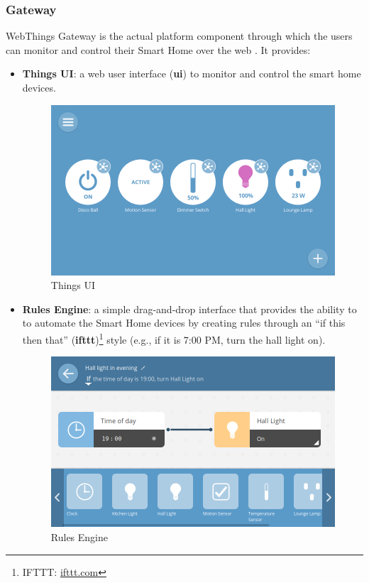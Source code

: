 \subsubsection{Gateway}
WebThings Gateway is the actual platform component through which the users can monitor and control their Smart Home over the web \cite{wtgateway}. It provides:
\begin{itemize}
    \item \textbf{Things UI}: a web user interface (\textbf{\gls{ui}}) to monitor and control the smart home devices.
        \begin{figure}[H]
        \centering
        \includegraphics[scale=0.25]{images/webthings/things_ui_screenshot.png}
        \caption{Things UI \cite{wtgateway}}
        \end{figure}

    \item \textbf{Rules Engine}: a simple drag-and-drop interface that provides the ability to to automate the Smart Home devices by creating rules through an ``if this then that'' (\textbf{\gls{ifttt}})\footnote{IFTTT: \href{https://ifttt.com/explore/new_to_ifttt}{ifttt.com}} style (e.g., if it is 7:00 PM, turn the hall light on).
    
        \begin{figure}[H]
        \centering
        \includegraphics[scale=0.25]{images/webthings/rules_engine_screenshot.png}
        \caption{Rules Engine \cite{wtgateway}}
        \end{figure}


\end{itemize}
